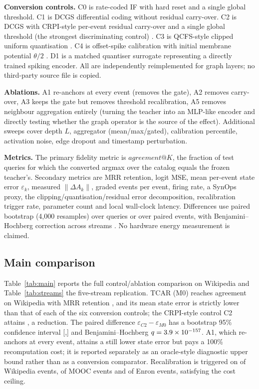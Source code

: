 \documentclass[preprint,12pt]{elsarticle}
\begin{document}
\textbf{Conversion controls.} C0 is rate-coded IF with hard reset and a single global threshold. C1 is DCGS differential coding without residual carry-over. C2 is DCGS with CRPI-style per-event residual carry-over and a single global threshold (the strongest discriminating control) \cite{xu2026crpi}. C3 is QCFS-style clipped uniform quantisation \cite{bu2022qcfs}. C4 is offset-spike calibration with initial membrane potential $\theta/2$ \cite{cos2023offset}. D1 is a matched quantiser surrogate representing a directly trained spiking encoder. All are independently reimplemented for graph layers; no third-party source file is copied.

\textbf{Ablations.} A1 re-anchors at every event (removes the gate), A2 removes carry-over, A3 keeps the gate but removes threshold recalibration, A5 removes neighbour aggregation entirely (turning the teacher into an MLP-like encoder and directly testing whether the graph operator is the source of the effect). Additional sweeps cover depth $L$, aggregator (mean/max/gated), calibration percentile, activation noise, edge dropout and timestamp perturbation.

\textbf{Metrics.} The primary fidelity metric is $\mathit{agreement@}K$, the fraction of test queries for which the converted argmax over the catalog equals the frozen teacher's. Secondary metrics are MRR retention, logit MSE, mean per-event state error $\varepsilon_k$, measured $\|\Delta A_k\|$, graded events per event, firing rate, a SynOps proxy, the clipping/quantisation/residual error decomposition, recalibration trigger rate, parameter count and local wall-clock latency. Differences use paired bootstrap (4,000 resamples) over queries or over paired events, with Benjamini--Hochberg correction across streams \cite{poursafaei2022}. No hardware energy measurement is claimed.

\subsection{Main comparison}

Table~\ref{tab:main} reports the full control/ablation comparison on Wikipedia and Table~\ref{tab:streams} the five-stream replication. TCAR (M0) reaches agreement \AgreeWiki{} on Wikipedia with MRR retention \RetWiki{}, and its mean state error \EpsMzeroWiki{} is strictly lower than that of each of the six conversion controls; the CRPI-style control C2 attains \EpsCtwoWiki{}, a \RedWiki{} reduction. The paired difference $\varepsilon_{C2}-\varepsilon_{M0}$ has a bootstrap 95\% confidence interval [\CIWikiLo{},\CIWikiHi{}] and Benjamini--Hochberg $q=3.9\times10^{-157}{}$. A1, which re-anchors at every event, attains a still lower state error but pays a 100\% recomputation cost; it is reported separately as an oracle-style diagnostic upper bound rather than as a conversion comparator. Recalibration is triggered on \TrigWiki{} of Wikipedia events, \TrigMooc{} of MOOC events and \TrigEnron{} of Enron events, satisfying the cost ceiling.
\end{document}
